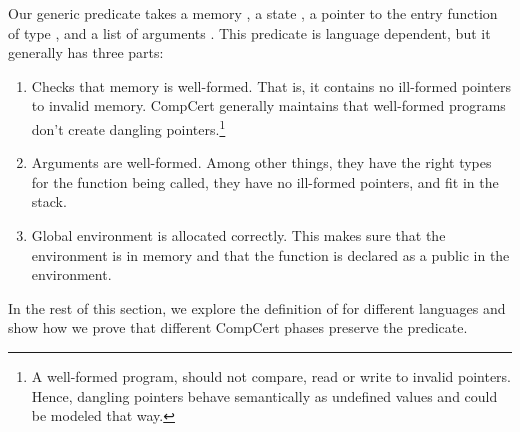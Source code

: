 Our generic predicate  takes a memory , a state , a pointer to the entry function  of type , and a list of arguments . This predicate is language dependent, but it generally has three parts:
\begin{enumerate}
\item Checks that memory is well-formed. That is, it contains no ill-formed pointers to invalid memory. CompCert generally maintains that well-formed programs don't create dangling pointers.\footnote{A well-formed program, should not compare, read or write to invalid pointers. Hence, dangling pointers behave semantically as undefined values and could be modeled that way.}
\item Arguments are well-formed. Among other things, they have the right types for the function being called, they have no ill-formed pointers, and fit in the stack. 
\item Global environment is allocated correctly. This makes sure that the environment is in memory and that the function is declared as a public in the environment.
\end{enumerate}
In the rest of this section, we explore the definition of  for different languages and show how we prove that different CompCert phases preserve the predicate.

